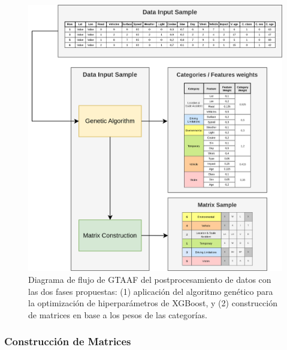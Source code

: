 \documentclass{uathesis-es}
\begin{document}
\begin{figure}[H]
    \centering
    \includegraphics[width=14cm]{Figures/Postprocessing_2.png}
    \caption{Diagrama de flujo de GTAAF del postprocesamiento de datos con las dos fases propuestas: (1) aplicación del algoritmo genético para la optimización de hiperparámetros de XGBoost, y (2) construcción de matrices en base a los pesos de las categorías.}
    \label{PostprocessingStage}
\end{figure}

\subsubsection{Construcción de Matrices}
\end{document}
